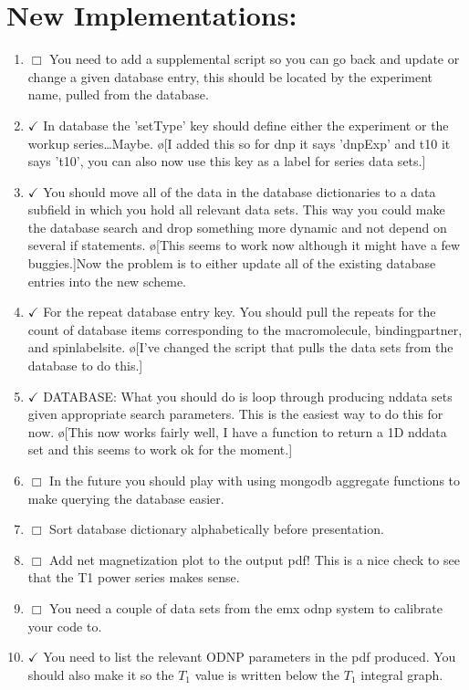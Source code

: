 \documentclass[10pt]{book}
\begin{document}
\section{New Implementations:}
\begin{enumerate}
    \item $\Box$ You need to add a supplemental script so you can go back and update or change a given database entry, this should be located by the experiment name, pulled from the database.
    \item $\checkmark$ In database the 'setType' key should define either the experiment or the workup series\ldots Maybe. \o[I added this so for dnp it says 'dnpExp' and t10 it says 't10', you can also now use this key as a label for series data sets.]{}
    \item $\checkmark$ You should move all of the data in the database dictionaries to a data subfield in which you hold all relevant data sets. This way you could make the database search and drop something more dynamic and not depend on several if statements. \o[This seems to work now although it might have a few buggies.]{Now the problem is to either update all of the existing database entries into the new scheme.}
    \item $\checkmark$ For the repeat database entry key. You should pull the repeats for the count of database items corresponding to the macromolecule, bindingpartner, and spinlabelsite. \o[I've changed the script that pulls the data sets from the database to do this.]{}
    \item $\checkmark$ DATABASE: What you should do is loop through producing nddata sets given appropriate search parameters. This is the easiest way to do this for now. \o[This now works fairly well, I have a function to return a 1D nddata set and this seems to work ok for the moment.]{}
    \item $\Box$ In the future you should play with using mongodb aggregate functions to make querying the database easier.
    \item $\Box$ Sort database dictionary alphabetically before presentation.
    \item $\Box$ Add net magnetization plot to the output pdf! This is a nice check to see that the T1 power series makes sense.
    \item $\Box$ You need a couple of data sets from the emx odnp system to calibrate your code to.
    \item $\checkmark$ You need to list the relevant ODNP parameters in the pdf produced. You should also make it so the $T_1$ value is written below the $T_1$ integral graph.

\end{enumerate}
\end{document}
